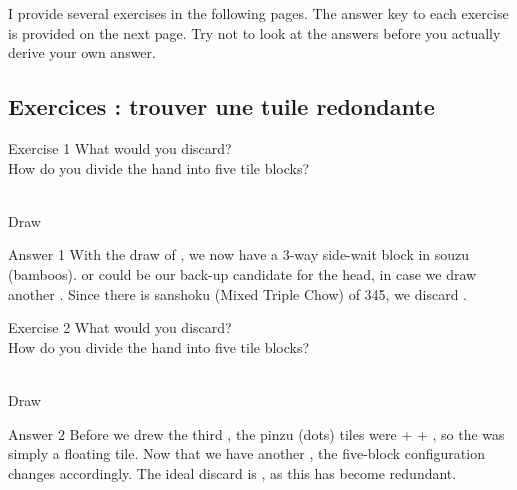 \bigskip
I provide several exercises in the following pages. The answer key to each exercise is provided on the next page. Try not to look at the answers before you actually derive your own answer. 

\vfill

\subsection*{Exercices : trouver une tuile redondante}

\bigskip

\begin{itembox}[l]{Exercise 1}
What would you discard? \\
\vsp
How do you divide the hand into five tile blocks? 

\bp
{}~\\
\hfill\footnotesize{Draw~~~~~~~~~~~}
\ep
\end{itembox}

\newpage

\begin{itembox}[r]{Answer 1}
\emj
With the draw of {\LARGE{}}, we now have a 3-way side-wait block in {\jap souzu} (bamboos). {\LARGE{}} or {\LARGE{}} could be our back-up candidate for the head, in case we draw another {\LARGE{}}. Since there is {\jap sanshoku} (Mixed Triple Chow) of 345, we discard {\LARGE{}}. 
\end{itembox}

\vfill

\begin{itembox}[l]{Exercise 2}
What would you discard? \\
\vsp
How do you divide the hand into five tile blocks? 

\bp
{}~\\
\hfill\footnotesize{Draw~~~~~~~~~~~}
\ep
\end{itembox}

\newpage


\bigskip
\begin{itembox}[r]{Answer 2}
\emj
Before we drew the third {\LARGE{}}, the {\jap pinzu} (dots) tiles were {\LARGE{} +  + }, so the {\LARGE{}} was simply a floating tile. Now that we have another {\LARGE{}}, the five-block configuration changes accordingly. The ideal discard is {\LARGE{}}, as this has become redundant.
\end{itembox}

